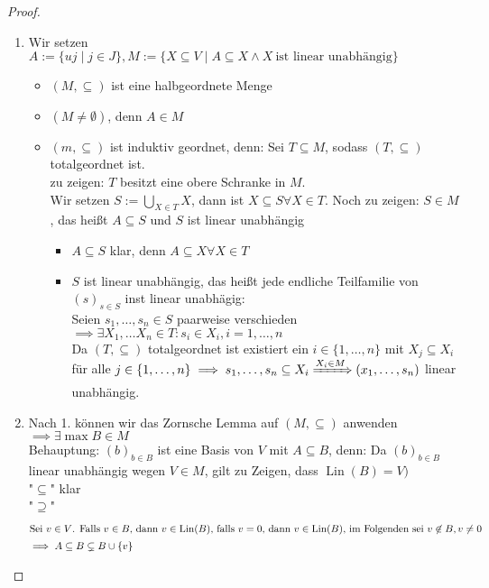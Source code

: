 \documentclass[a4paper]{scrartcl}
\DeclareMathOperator{\Exists}{\exists}
\DeclareMathOperator{\Forall}{\forall}
\DeclareMathOperator{\Lin}{Lin}
\theoremstyle{definition}
\theoremstyle{plain}
\theoremstyle{plain}
\theoremstyle{remark}
\theoremstyle{remark}
\theoremstyle{remark}
\theoremstyle{remark}
\theoremstyle{remark}
\begin{document}
\begin{proof}
\begin{enumerate}
\item Wir setzen $A:= \{uj \mid j \in J\}, M:= \{X \subseteq V \mid A\subseteq X \wedge X ~\text{ist linear unabhängig}\}$
\begin{itemize}
\item $(M, \subseteq)$ ist eine halbgeordnete Menge
\item $(M \neq \emptyset)$, denn $A\in M$
\item $(m, \subseteq)$ ist induktiv geordnet, denn:
Sei $T\subseteq M$, sodass $(T,\subseteq)$ totalgeordnet ist. \\
       zu zeigen: $T$ besitzt eine obere Schranke in $M$. \\
       Wir setzen $\displaystyle S:= \bigcup_{X\in T} X$, dann ist $X\subseteq S \Forall X\in T$.
Noch zu zeigen: $S\in M$, das heißt $A\subseteq S$ und $S$ ist linear unabhängig
\begin{itemize}
\item $A\subseteq S$ klar, denn $A\subseteq X\Forall X\in T$
\item $S$ ist linear unabhängig, das heißt jede endliche Teilfamilie von $(s)_{s\in S}$ inst linear unabhägig: \\
         Seien $s_1, \ldots, s_n \in S$ paarweise verschieden $\implies \Exists X_1, \ldots X_n \in T: s_i \in X_i, i = 1, \ldots, n$ \\
         Da $(T, \subseteq)$ totalgeordnet ist existiert ein $i\in \{1, \ldots, n\}$ mit $X_j \subseteq X_i$ für alle $j\in \{1,\ldots,n\} \implies s_1, \ldots, s_n \subseteq X_i \xRightarrow{X_i \in M} (x_1, \ldots, s_n)$ linear unabhängig.
\end{itemize}
\end{itemize}
\item Nach 1. können wir das Zornsche Lemma auf $(M,\subseteq)$ anwenden $\implies \Exists \max B \in M$ \\
     Behauptung: $(b)_{b\in B}$ ist eine Basis von $V$ mit $A\subseteq B$, denn: Da $(b)_{b\in B}$ linear unabhängig wegen $V\in M$, gilt zu Zeigen, dass $\Lin(B) = V)$ \\
     "$\subseteq$" klar \\
     "$\supseteq$"
\begin{align*}
\intertext{Sei $v \in V$. Falls $v\in B$, dann $v\in\Lin(B)$, falls $v = 0$, dann $v\in \Lin(B)$, im Folgenden sei $v\not\in B, v\neq 0$}
\implies A \subseteq B \subsetneq B\cup \{v\} \\

\end{align*}
\end{enumerate}
\end{proof}
\end{document}
